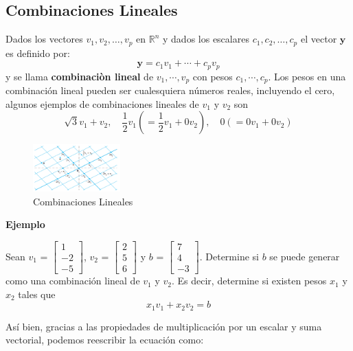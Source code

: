 \documentclass{article}
\begin{document}
\subsection*{Combinaciones Lineales}

Dados los vectores $v_1,v_2,\dots, v_p$ en $\mathbb{R}^n$ y dados los escalares $c_1,c_2,\dots, c_p$ el vector $\mathbf{y}$ es definido por:$$\mathbf{y} = c_1v_1 + \dotsb +  c_pv_p$$ y se llama \textbf{combinaciòn lineal} de $v_1, \dotsb, v_p$ con pesos $c_1, \dotsb, c_p$. Los pesos en una combinación lineal pueden ser cualesquiera números reales, incluyendo el cero, algunos ejemplos de combinaciones lineales de $v_1$ y $v_2$ son $$\sqrt{3}v_1 + v_2, \quad \frac{1}{2}v_1(= \frac{1}{2}v_1 + 0v_2), \quad 0 (= 0v_1 + 0v_2)$$

\begin{figure}[ht]
    \centerline{\includegraphics[width=0.3\textwidth]{image10.png}}
    \caption{Combinaciones Lineales}
    \label{}
\end{figure}

\begin{large}
    \textbf{Ejemplo}
\end{large}

Sean \textbf{$v_1$} = $\begin{bmatrix} 1\\-2\\-5 \end{bmatrix}$, \textbf{$v_2$} = $\begin{bmatrix} 2\\5\\6 \end{bmatrix}$  y \textbf{$b$} = $\begin{bmatrix} 7\\4\\-3 \end{bmatrix}$. Determine si \textbf{$b$} se puede generar como una combinación lineal de \textbf{$v_1$} y \textbf{$v_2$}. Es decir, determine si existen pesos $x_1$ y $x_2$ tales que $$x_1\textbf{$v_1$} + x_2\textbf{$v_2$} = \textbf{$b$}$$

Así bien, gracias a las propiedades de multiplicación por un escalar y suma vectorial, podemos reescribir la ecuación como:
\end{document}

